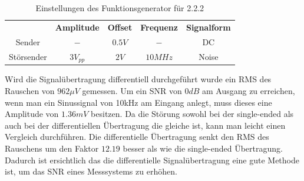 \documentclass[a4paper,12pt]{article}
\begin{document}
	\begin{table}[h]
		\centering
		\begin{tabular}{|c|c|c|c|c|}
			\hline
			\multirow{2}{*}{} & \multirow{2}{*}{\textbf{Amplitude}} & \multirow{2}{*}{\textbf{Offset}} & \multirow{2}{*}{\textbf{Frequenz}} & \multirow{2}{*}{\textbf{Signalform}} \\
			&  &  &  &  \\ \hline
			\multirow{2}{*}{Sender} & \multirow{2}{*}{$-$} & \multirow{2}{*}{$0.5V$} & \multirow{2}{*}{$-$} & \multirow{2}{*}{DC} \\
			&  &  &  &  \\ \hline
			\multirow{2}{*}{Störsender} & \multirow{2}{*}{$3V_{pp}$} & \multirow{2}{*}{$2V$} & \multirow{2}{*}{$10MHz$} & \multirow{2}{*}{Noise} \\
			&  &  &  &  \\ \hline
		\end{tabular}
		\caption{Einstellungen des Funktionsgenerator für 2.2.2}
	\end{table}
    \newline
	Wird die Signalübertragung differentiell durchgeführt wurde ein RMS des Rauschen von $962\mu V$ gemessen. Um  ein SNR von $0dB$ am Ausgang zu erreichen, wenn man ein Sinussignal von 10kHz am Eingang anlegt, muss dieses eine Amplitude von $1.36mV$ besitzen. Da die Störung sowohl bei der single-ended als auch bei der differentiellen Übertragung die gleiche ist, kann man leicht einen Vergleich durchführen.
	\newpage
	\noindent
	Die differentielle Übertragung senkt den RMS des Rauschens um den Faktor $12.19$ besser als wie die single-ended Übertragung. Dadurch ist ersichtlich das die differentielle Signalübertragung eine gute Methode ist, um das SNR eines Messsystems zu erhöhen.
	
\end{document}
